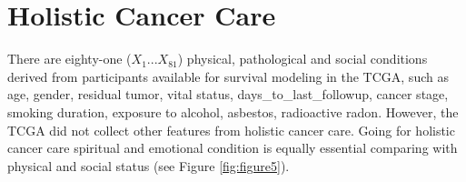 \documentclass[12pt, a4paper]{article}
\begin{document}











\section{Holistic Cancer Care}



There are eighty-one ($X_1 ... X_{81}$) physical, pathological and social conditions derived from participants available for survival modeling in the TCGA, %
such as age, gender, residual tumor, vital status, days\_to\_last\_followup, cancer stage, smoking duration, exposure to alcohol, asbestos, radioactive radon. 
However, the TCGA did not collect other features from holistic cancer care.
Going for holistic cancer care\citep{Mehta2019}\citep{Iftikhar2021} spiritual and emotional condition is equally essential comparing with physical and social status (see Figure \ref{fig:figure5}).
\end{document}
